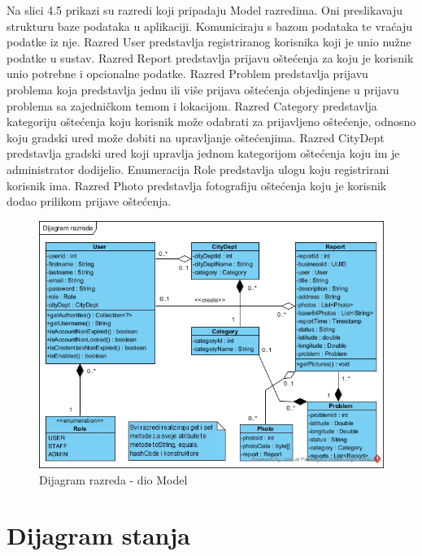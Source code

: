 Na slici 4.5 prikazi su razredi koji pripadaju Model razredima. Oni preslikavaju strukturu baze podataka
u aplikaciji. Komuniciraju s bazom podataka te vraćaju podatke iz nje. Razred User predstavlja registriranog
korisnika koji je unio nužne podatke u sustav. Razred Report predstavlja prijavu oštećenja za koju je korisnik
unio potrebne i opcionalne podatke. Razred Problem predstavlja prijavu problema koja predstavlja jednu ili više
prijava oštećenja objedinjene u prijavu problema sa zajedničkom temom i lokacijom. Razred Category predstavlja
kategoriju oštećenja koju korisnik može odabrati za prijavljeno oštećenje, odnosno koju gradski ured može dobiti
na upravljanje oštećenjima. Razred CityDept predstavlja gradski ured koji upravlja jednom kategorijom oštećenja
koju im je administrator dodijelio. Enumeracija Role predstavlja ulogu koju registrirani korisnik ima. Razred
Photo predstavlja fotografiju oštećenja koju je korisnik dodao prilikom prijave oštećenja.

\begin{figure}[H]
	\includegraphics[scale=0.60]{slike/DR-model.jpg} %
	\centering
	\caption{Dijagram razreda - dio Model}
	\label{fig:DijagramRazredaModel}
\end{figure}

\eject

\section{Dijagram stanja}

